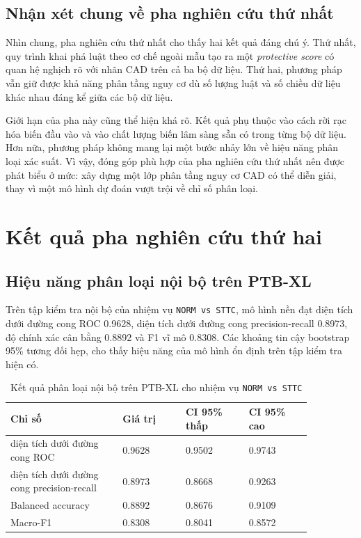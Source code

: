 \blocksep

\subsection{Nhận xét chung về pha nghiên cứu thứ nhất}

\blocksep

Nhìn chung, pha nghiên cứu thứ nhất cho thấy hai kết quả đáng chú ý. Thứ nhất, quy trình khai phá luật theo cơ chế ngoài mẫu tạo ra một \textit{protective score} có quan hệ nghịch rõ với nhãn CAD trên cả ba bộ dữ liệu. Thứ hai, phương pháp vẫn giữ được khả năng phân tầng nguy cơ dù số lượng luật và số chiều dữ liệu khác nhau đáng kể giữa các bộ dữ liệu.

\blocksep

Giới hạn của pha này cũng thể hiện khá rõ. Kết quả phụ thuộc vào cách rời rạc hóa biến đầu vào và vào chất lượng biến lâm sàng sẵn có trong từng bộ dữ liệu. Hơn nữa, phương pháp không mang lại một bước nhảy lớn về hiệu năng phân loại xác suất. Vì vậy, đóng góp phù hợp của pha nghiên cứu thứ nhất nên được phát biểu ở mức: xây dựng một lớp phân tầng nguy cơ CAD có thể diễn giải, thay vì một mô hình dự đoán vượt trội về chỉ số phân loại.

\section{Kết quả pha nghiên cứu thứ hai}

\blocksep

\subsection{Hiệu năng phân loại nội bộ trên PTB-XL}

\blocksep

Trên tập kiểm tra nội bộ của nhiệm vụ \texttt{NORM vs STTC}, mô hình nền đạt diện tích dưới đường cong ROC 0.9628, diện tích dưới đường cong precision-recall 0.8973, độ chính xác cân bằng 0.8892 và F1 vĩ mô 0.8308. Các khoảng tin cậy bootstrap 95\% tương đối hẹp, cho thấy hiệu năng của mô hình ổn định trên tập kiểm tra hiện có.

\begin{table}[H]
\centering
\caption{Kết quả phân loại nội bộ trên PTB-XL cho nhiệm vụ \texttt{NORM vs STTC}}
\label{tab:phase2_ptbxl_cls}
\begin{tabular}{p{0.32\linewidth}C{0.18\linewidth}C{0.18\linewidth}C{0.18\linewidth}}
\hline
\textbf{Chỉ số} & \textbf{Giá trị} & \textbf{CI 95\% thấp} & \textbf{CI 95\% cao} \\
\hline
diện tích dưới đường cong ROC & 0.9628 & 0.9502 & 0.9743 \\
diện tích dưới đường cong precision-recall & 0.8973 & 0.8668 & 0.9263 \\
Balanced accuracy & 0.8892 & 0.8676 & 0.9109 \\
Macro-F1 & 0.8308 & 0.8041 & 0.8572 \\
\hline
\end{tabular}
\end{table}

